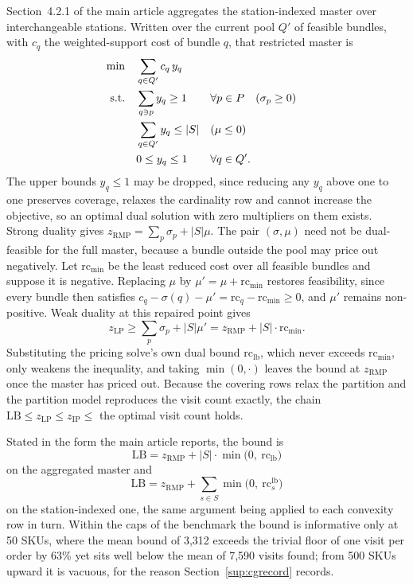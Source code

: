 \documentclass[11pt]{article}
\begin{document}
Section~4.2.1 of the main article aggregates the station-indexed master over interchangeable
stations. Written over the current pool $Q'$ of feasible bundles, with $c_q$ the weighted-support
cost of bundle $q$, that restricted master is
\begin{align}
\min \quad & \sum_{q \in Q'} c_q\, y_q \notag\\
\text{s.t.} \quad
& \sum_{q \ni p} y_q \ge 1 && \forall p \in P \quad (\sigma_p \ge 0) \label{sup:eq:cover}\\
& \sum_{q \in Q'} y_q \le |S| && (\mu \le 0) \label{sup:eq:card}\\
& 0 \le y_q \le 1 && \forall q \in Q'. \notag
\end{align}
The upper bounds $y_q\le 1$ may be dropped, since reducing any $y_q$ above one to one preserves
coverage, relaxes the cardinality row and cannot increase the objective, so an optimal dual
solution with zero multipliers on them exists. Strong duality gives
$z_{\mathrm{RMP}}=\sum_p\sigma_p+|S|\mu$. The pair $(\sigma,\mu)$ need not be dual-feasible for the
full master, because a bundle outside the pool may price out negatively. Let $\mathrm{rc}_{\min}$
be the least reduced cost over all feasible bundles and suppose it is negative. Replacing $\mu$ by
$\mu'=\mu+\mathrm{rc}_{\min}$ restores feasibility, since every bundle then satisfies
$c_q-\sigma(q)-\mu'=\mathrm{rc}_q-\mathrm{rc}_{\min}\ge 0$, and $\mu'$ remains non-positive. Weak
duality at this repaired point gives
\begin{equation*}
z_{\mathrm{LP}}\ge\sum_p\sigma_p+|S|\mu'=z_{\mathrm{RMP}}+|S|\cdot\mathrm{rc}_{\min}.
\end{equation*}
Substituting the pricing solve's own dual bound $\mathrm{rc}_{\mathrm{lb}}$, which never exceeds
$\mathrm{rc}_{\min}$, only weakens the inequality, and taking $\min(0,\cdot)$ leaves the bound at
$z_{\mathrm{RMP}}$ once the master has priced out. Because the covering rows relax the partition
and the partition model reproduces the visit count exactly, the chain
$\mathrm{LB}\le z_{\mathrm{LP}}\le z_{\mathrm{IP}}\le$ the optimal visit count holds.

Stated in the form the main article reports, the bound is
\[
\mathrm{LB} = z_{\mathrm{RMP}} + |S|\cdot \min\bigl(0,\ \mathrm{rc}_{\mathrm{lb}}\bigr)
\]
on the aggregated master and
\[
\mathrm{LB} = z_{\mathrm{RMP}} + \sum_{s \in S} \min\bigl(0,\ \mathrm{rc}^{\mathrm{lb}}_s\bigr)
\]
on the station-indexed one, the same argument being applied to each convexity row in turn. Within
the caps of the benchmark the bound is informative only at 50 SKUs, where the mean bound of 3,312
exceeds the trivial floor of one visit per order by 63\% yet sits well below the mean of 7,590
visits found; from 500 SKUs upward it is vacuous, for the reason Section~\ref{sup:cgrecord}
records.
\end{document}
